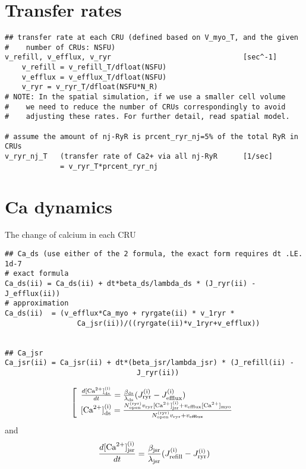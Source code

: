 \section{Transfer rates}
\label{sec:transfer-rates}


\begin{verbatim}
## transfer rate at each CRU (defined based on V_myo_T, and the given
#    number of CRUs: NSFU)
v_refill, v_efflux, v_ryr                               [sec^-1]
    v_refill = v_refill_T/dfloat(NSFU)
    v_efflux = v_efflux_T/dfloat(NSFU)
    v_ryr = v_ryr_T/dfloat(NSFU*N_R)
# NOTE: In the spatial simulation, if we use a smaller cell volume
#    we need to reduce the number of CRUs correspondingly to avoid
#    adjusting these rates. For further detail, read spatial model.

# assume the amount of nj-RyR is prcent_ryr_nj=5% of the total RyR in CRUs
v_ryr_nj_T   (transfer rate of Ca2+ via all nj-RyR      [1/sec]
             = v_ryr_T*prcent_ryr_nj
\end{verbatim}



\section{Ca dynamics}
\label{sec:calcium-dynamics}


The change of calcium in each CRU
\begin{verbatim}
## Ca_ds (use either of the 2 formula, the exact form requires dt .LE. 1d-7
# exact formula
Ca_ds(ii) = Ca_ds(ii) + dt*beta_ds/lambda_ds * (J_ryr(ii) - J_efflux(ii))
# approximation
Ca_ds(ii)  = (v_efflux*Ca_myo + ryrgate(ii) * v_1ryr *
                 Ca_jsr(ii))/((ryrgate(ii)*v_1ryr+v_efflux)) 


## Ca_jsr             
Ca_jsr(ii) = Ca_jsr(ii) + dt*(beta_jsr/lambda_jsr) * (J_refill(ii) -
                               J_ryr(ii))   
\end{verbatim}
\begin{equation}
  \label{eq:28}
  \left[ 
    \begin{array}{l}
      \frac{d[{\text{Ca}^{2+}}]_{\text{ds}}^{\text{(i)}}}{dt} = \frac{\beta_{\text{ds}}}{\lambda_{\text{ds}}}(J_{\text{ryr}}^{\text{(i)}} -
      J_{\text{efflux}}^{\text{(i)}} )   \\
      \text{[}{\text{Ca}^{2+}}]_{\text{ds}}^{\text{(i)}} =      \frac{N_{\text{open}}^{(\text{ryr})}v_{\text{ryr}}[{\text{Ca}^{2+}}]_{\text{jsr}}^{\text{(i)}}+v_{\text{efflux}}[{\text{Ca}^{2+}}]_{\text{myo}}}{N_{\text{open}}^{(\text{ryr})}v_{\text{ryr}}+v_{\text{efflux}}} 
    \end{array}
\right.
\end{equation}
and
\begin{equation}
  \label{eq:29}
  \frac{d[{\text{Ca}^{2+}}]_{\text{jsr}}^{\text{(i)}}}{dt} = \frac{\beta_{\text{jsr}}}{\lambda_{\text{jsr}}}(J_{\text{refill}}^{\text{(i)}}-J_{\text{ryr}}^{\text{(i)}})
\end{equation}

